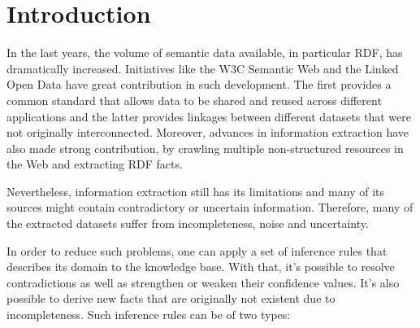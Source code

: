 \chapter{Introduction}
\label{ch:intro}

In the last years, the volume of semantic data available, in particular RDF, has dramatically increased. Initiatives
like the W3C Semantic Web and the Linked Open Data  have great contribution in such development. The first provides a common standard that allows data to be shared and reused across different applications and the latter provides linkages between different datasets that were not originally interconnected. Moreover, advances in information extraction have also made strong contribution, by crawling multiple non-structured resources in the Web and extracting RDF facts.

Nevertheless, information extraction still has its limitations and many of its sources might contain contradictory
or uncertain information. Therefore, many of the extracted datasets suffer from incompleteness, noise and uncertainty.

In order to reduce such problems, one can apply a set of inference rules that describes its domain to the knowledge base. With that, it's possible to resolve contradictions as well as strengthen or weaken their confidence values. It's also possible to derive new facts that are originally not existent due to incompleteness. Such inference rules can be of two types:

